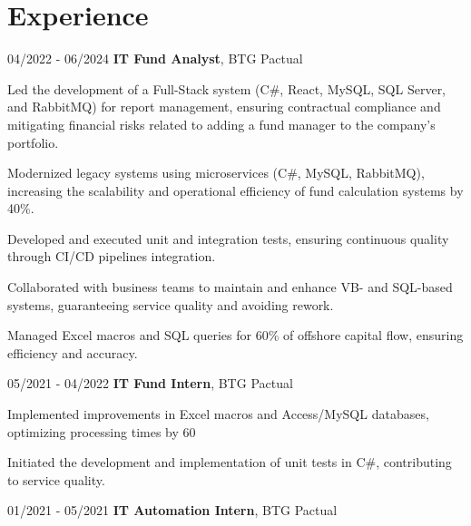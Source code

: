 \section{Experience}
	\begin{twocolentry}{04/2022 - 06/2024}
		\textbf{IT Fund Analyst}, BTG Pactual
	\end{twocolentry}

	\begin{onecolentry}
		\begin{highlights}
			\item Led the development of a Full-Stack system (C\#, React, MySQL, SQL Server, and RabbitMQ) for report management, ensuring contractual compliance and mitigating financial risks related to adding a fund manager to the company's portfolio.
			\item Modernized legacy systems using microservices (C\#, MySQL, RabbitMQ), increasing the scalability and operational efficiency of fund calculation systems by 40\%.
			\item Developed and executed unit and integration tests, ensuring continuous quality through CI/CD pipelines integration.
			\item Collaborated with business teams to maintain and enhance VB- and SQL-based systems, guaranteeing service quality and avoiding rework.
			\item Managed Excel macros and SQL queries for 60\% of offshore capital flow, ensuring efficiency and accuracy.
		\end{highlights}
	\end{onecolentry}

	\begin{twocolentry}{05/2021 - 04/2022}
		\textbf{IT Fund Intern}, BTG Pactual
	\end{twocolentry}

	\begin{onecolentry}
		\begin{highlights}
			\item Implemented improvements in Excel macros and Access/MySQL databases, optimizing processing times by 60%
			\item Initiated the development and implementation of unit tests in C\#, contributing to service quality.
		\end{highlights}
	\end{onecolentry}

	\begin{twocolentry}{01/2021 - 05/2021}
		\textbf{IT Automation Intern}, BTG Pactual
	\end{twocolentry}

